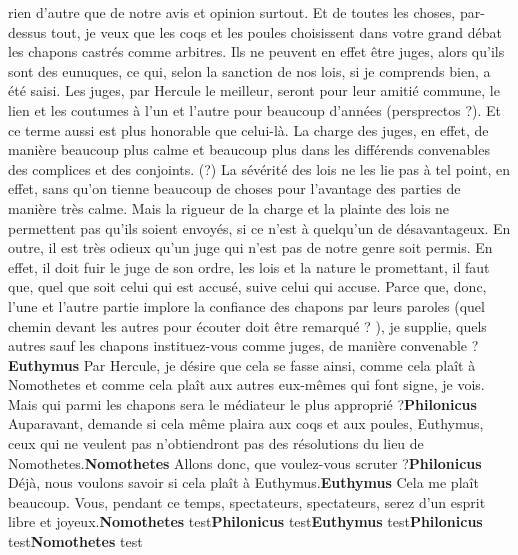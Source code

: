 \documentclass[12pt]{book}
\begin{document}
\begin{pages}
\begin{Rightside}
rien d’autre que de notre avis et opinion surtout. Et de toutes les choses, par-dessus tout, je veux que les coqs et les poules choisissent dans votre grand débat les chapons castrés comme arbitres. Ils ne peuvent en effet être juges, alors qu’ils sont des eunuques, ce qui, selon la sanction de nos lois, si je comprends bien, a été saisi. Les juges, par Hercule le meilleur, seront pour leur amitié commune, le lien et les coutumes à l’un et l’autre pour beaucoup d’années (persprectos ?). Et ce terme aussi est plus honorable que celui-là. La charge des juges, en effet, de manière beaucoup plus calme et beaucoup plus dans les différends convenables des complices et des conjoints. (?) La sévérité des lois ne les lie pas à tel point, en effet, sans qu’on tienne beaucoup de choses pour l’avantage des parties de manière très calme. Mais la rigueur de la charge et la plainte des lois ne permettent pas qu’ils soient envoyés, si ce n’est à quelqu’un de désavantageux. En outre, il est très odieux qu’un juge qui n’est pas de notre genre soit permis. En effet, il doit fuir le juge de son ordre, les lois et la nature le promettant, il faut que, quel que soit celui qui est accusé, suive celui qui accuse. Parce que, donc, l’une et l’autre partie implore la confiance des chapons par leurs paroles (quel chemin devant les autres pour écouter doit être remarqué ? ), je supplie, quels autres sauf les chapons instituez-vous comme juges, de manière convenable ?\pend\pstart\textbf{Euthymus }\hspace{1cm} Par Hercule, je désire que cela se fasse ainsi, comme cela plaît à Nomothetes et comme cela plaît aux autres eux-mêmes qui font signe, je vois. Mais qui parmi les chapons sera le médiateur le plus approprié ?\pend\pstart\textbf{Philonicus }\hspace{1cm} Auparavant, demande si cela même plaira aux coqs et aux poules, Euthymus, ceux qui ne veulent pas n’obtiendront pas des résolutions du lieu de Nomothetes.\pend\pstart\textbf{Nomothetes }\hspace{1cm} Allons donc, que voulez-vous scruter ?\pend\pstart\textbf{Philonicus }\hspace{1cm} Déjà, nous voulons savoir si cela plaît à Euthymus.\pend\pstart\textbf{Euthymus }\hspace{1cm} Cela me plaît beaucoup. Vous, pendant ce temps, spectateurs, spectateurs, serez d’un esprit libre et joyeux.\pend\pstart\textbf{Nomothetes }\hspace{1cm} test\pend\pstart\textbf{Philonicus }\hspace{1cm} test\pend\pstart\textbf{Euthymus }\hspace{1cm} test\pend\pstart\textbf{Philonicus }\hspace{1cm} test\pend\pstart\textbf{Nomothetes }\hspace{1cm} test\pend
        \endnumbering
        \end{Rightside}
        \end{pages}
        \Pages
        
\end{document}
